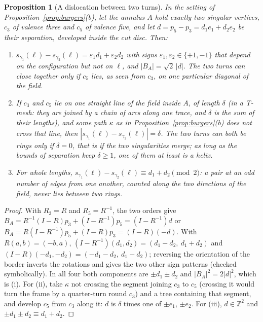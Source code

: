 \documentclass[11pt,a4paper]{article}
\newtheorem{proposition}{Proposition}
\newcommand{\Z}{\mathbb{Z}}
\newcommand{\shift}{s}
\newcommand{\lean}[1]{\texttt{\detokenize{#1}}}
\newenvironment{evidence}[3][]{}{}
\begin{document}
\begin{evidence}{core}{\lean{dislocation_burgers}, \lean{dislocation}, \lean{dislocation_closes_iff}; tested: (i) on 5 annuli holding one 3--5 pair of 50 random instances; assumed: as in the proposition above}
\begin{proposition}[A dislocation between two turns]\label{prop:dislocation}
In the setting of Proposition~\ref{prop:burgers}(b), let the annulus $A$ hold
exactly two singular vertices, $c_3$ of valence three and $c_5$ of valence
five, and let $d = p_5 - p_3 = d_1 e_1 + d_2 e_2$ be their separation,
developed inside the cut disc. Then:
\begin{enumerate}
\item[(i)] $\shift_{\gamma_1}(\ell) - \shift_{\gamma_2}(\ell) = \varepsilon_1
  d_1 + \varepsilon_2 d_2$ with signs $\varepsilon_1, \varepsilon_2 \in \{+1,
  -1\}$ that depend on the configuration but not on $\ell$, and $|B_A| =
  \sqrt2\,|d|$. The two turns can close together only if $c_5$ lies, as seen
  from $c_3$, on one particular diagonal of the field.
\item[(ii)] If $c_3$ and $c_5$ lie on one straight line of the field inside
  $A$, of length $\delta$ (in a T-mesh: they are joined by a chain of arcs
  along one trace, and $\delta$ is the sum of their lengths), and some path
  $\kappa$ as in Proposition~\ref{prop:burgers}(b) does not cross that line,
  then
  $|\shift_{\gamma_1}(\ell) - \shift_{\gamma_2}(\ell)| = \delta$. The two turns
  can both be rings only if $\delta = 0$, that is if the two singularities
  merge; as long as the bounds of separation keep $\delta \ge 1$, one of them at
  least is a helix.
\item[(iii)] For whole lengths, $\shift_{\gamma_1}(\ell) -
  \shift_{\gamma_2}(\ell) \equiv d_1 + d_2 \pmod 2$: a pair at an odd number of
  edges from one another, counted along the two directions of the field, never
  lies between two rings.
\end{enumerate}
\end{proposition}
\end{evidence}

\begin{proof}
With $R_3 = R$ and $R_5 = R^{-1}$, the two orders give $B_A = R^{-1}(I -
R)p_3 + (I - R^{-1})p_5 = (I - R^{-1})d$ or $B_A = R(I - R^{-1})p_5 + (I -
R)p_3 = (I - R)(-d)$. With $R(a, b) = (-b, a)$, $(I - R^{-1})(d_1, d_2) = (d_1 -
d_2,\ d_1 + d_2)$ and $(I - R)(-d_1, -d_2) = (-d_1 - d_2,\ d_1 - d_2)$;
reversing the orientation of the border inverts the rotations and gives the
two other sign patterns (checked symbolically). In all four both components
are $\pm d_1 \pm d_2$ and $|B_A|^2 = 2|d|^2$, which is (i). For (ii), take
$\kappa$ not crossing the segment joining $c_3$ to $c_5$ (crossing it would
turn the frame by a quarter-turn round $c_3$) and a tree containing that
segment, and develop $c_5$ from
$c_3$ along it: $d$ is $\delta$ times one of $\pm e_1$, $\pm e_2$. For (iii), $d
\in \Z^2$ and $\pm d_1 \pm d_2 \equiv d_1 + d_2$.
\end{proof}
\end{document}

